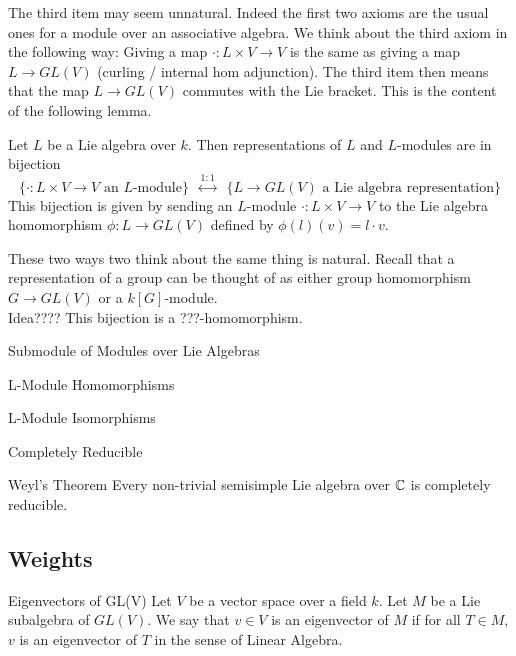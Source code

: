 \documentclass[a4paper]{article}
\begin{document}
The third item may seem unnatural. Indeed the first two axioms are the usual ones for a module over an associative algebra. We think about the third axiom in the following way: Giving a map $\cdot:L\times V\to V$ is the same as giving a map $L\to GL(V)$ (curling / internal hom adjunction). The third item then means that the map $L\to GL(V)$ commutes with the Lie bracket. This is the content of the following lemma. 

\begin{prp}{}{} Let $L$ be a Lie algebra over $k$. Then representations of $L$ and $L$-modules are in bijection $$\{\cdot:L\times V\to V\text{ an }L\text{-module}\}\;\;\overset{1:1}{\leftrightarrow}\;\;\{L\to GL(V)\text{ a Lie algebra representation}\}$$ This bijection is given by sending an $L$-module $\cdot:L\times V\to V$ to the Lie algebra homomorphism $\phi:L\to GL(V)$ defined by $\phi(l)(v)=l\cdot v$. 
\end{prp}

These two ways two think about the same thing is natural. Recall that a representation of a group can be thought of as either group homomorphism $G\to GL(V)$ or a $k[G]$-module. \\

Idea???? This bijection is a ???-homomorphism. 

\begin{defn}{Submodule of Modules over Lie Algebras}{}
\end{defn}

\begin{defn}{L-Module Homomorphisms}{}
\end{defn}

\begin{defn}{L-Module Isomorphisms}{}
\end{defn}

\begin{defn}{Completely Reducible}{}
\end{defn}

\begin{thm}{Weyl's Theorem}{} Every non-trivial semisimple Lie algebra over $\mathbb{C}$ is completely reducible. 
\end{thm}

\subsection{Weights}
\begin{defn}{Eigenvectors of GL(V)}{} Let $V$ be a vector space over a field $k$. Let $M$ be a Lie subalgebra of $GL(V)$. We say that $v\in V$ is an eigenvector of $M$ if for all $T\in M$, $v$ is an eigenvector of $T$ in the sense of Linear Algebra. 
\end{defn}
\end{document}
